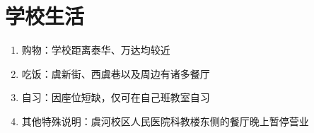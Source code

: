 \section[学校生活]{学校生活}
\begin{enumerate}
    \item 购物：学校距离泰华、万达均较近
    \item 吃饭：虞新街、西虞巷以及周边有诸多餐厅
    \item 自习：因座位短缺，仅可在自己班教室自习
    \item 其他特殊说明：虞河校区人民医院科教楼东侧的餐厅晚上暂停营业
\end{enumerate}
